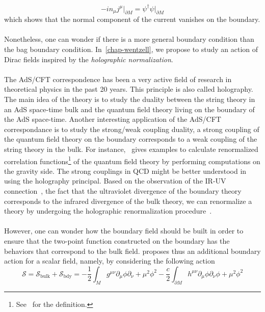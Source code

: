 \begin{equation*}
- i n_\mu j^\mu \big\vert_{\partial M} = \psi^\dagger\psi\big\vert_{\partial M}
\end{equation*}
which shows that the normal component of the current vanishes on the boundary. \\\\
Nonetheless, one can wonder if there is a more general boundary condition than the bag boundary condition. 
In~\cref{chap-wentzell}, we propose to study an action of Dirac fields inspired by the \textit{holographic normalization}. \\\\
%
The AdS/CFT correspondence has been a very active field of research in theoretical physics in the past 20 years. 
This principle is also called holography.
The main idea of the theory is to study the duality between the string theory in an AdS space-time bulk and the quantum field theory living on the boundary of the AdS space-time.
Another interesting application of the AdS/CFT correspondance is to study the strong/weak coupling duality, \ie
a strong coupling of the quantum field theory on the boundary corresponds to a weak coupling of the string theory in the bulk. 
For instance,~\cite{Skenderis2002} gives examples to calculate renormalized correlation functions\footnote{
See~\eg\cite{Peskin1995} for the definition.
} of the quantum field theory by performing computations on the gravity side.
The strong couplings in QCD might be better understood in using the holography principal. 
Based on the observation of the IR-UV connection~\cite{Susskind1998}, 
\ie the fact that the ultraviolet divergence of the boundary theory corresponds to the infrared divergence of the bulk theory, 
we can renormalize a theory by undergoing the holographic renormalization procedure~\cite{Skenderis2002}. \\\\
%
However, one can wonder how the boundary field should be built in order to ensure that the two-point function constructed on the boundary has the behaviors that correspond to the bulk field. 
\cite{Skenderis2002} proposes thus an additional boundary action for a scalar field, namely, by considering the following action
\begin{equation*}
\mathcal{S} = \mathcal{S}_{\mathrm{bulk}} + \mathcal{S}_{\mathrm{bdy}} = 
-\frac 1 2 \int_M g^{\mu\nu} \partial_\mu \phi \partial_{\nu} + 
\mu^2\phi^2 - \frac c 2 \int_{\partial M}h^{\mu\nu}\partial_\mu\phi\partial_\nu\phi + \mu^2\phi^2
\end{equation*}
